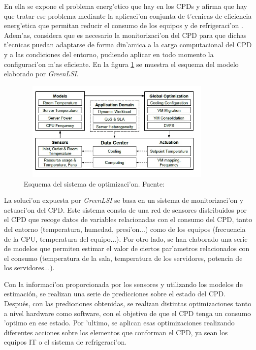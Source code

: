 	En ella se expone el problema energ'etico que hay en los CPDs y afirma que hay que tratar ese problema mediante la aplicaci'on conjunta de t'ecnicas de eficiencia energ'etica que permitan reducir el consumo de los equipos y de refrigeraci'on \cite{RespConj}. Adem'as, considera que es necesario la monitorizaci'on del CPD \cite{Monitorizacion} para que dichas t'ecnicas puedan adaptarse de forma din'amica a la carga computacional del CPD y a las condiciones del entorno, pudiendo aplicar en todo momento la configuraci'on m'as eficiente. En la figura \ref{fig1_2:esq} se muestra el esquema del modelo elaborado por \textit{GreenLSI}.

\begin{figure}[htbp]
  \centering
  \includegraphics[width=100mm, height=49mm]{imagenes/capitulo1/1_2Esquema}
   \caption{Esquema del sistema de optimizaci'on. Fuente:\cite{Esquema}}
   \label{fig1_2:esq}
\end{figure}
	
	La soluci'on expuesta por \textit{GreenLSI} se basa en un sistema de monitorizaci'on y actuaci'on del CPD. Este sistema consta de una red de sensores distribuidos por el CPD que recoge datos de variables relacionadas con el consumo del CPD, tanto del entorno (temperatura, humedad, presi'on...) como de los equipos (frecuencia de la CPU, temperatura del equipo...). Por otro lado, se han elaborado una serie de modelos \cite{Modelos} que permiten estimar el valor de ciertos par'ametros relacionados con el consumo (temperatura de la sala, temperatura de los servidores, potencia de los servidores...).

	Con la informaci'on proporcionada por los sensores y utilizando los modelos de estimación, se realizan una serie de predicciones sobre el estado del CPD. Después, con las predicciones obtenidas, se realizan distintas optimizaciones tanto a nivel hardware como software, con el objetivo de que el CPD tenga un consumo 'optimo en ese estado. Por 'ultimo, se aplican esas optimizaciones realizando diferentes acciones sobre los elementos que conforman el CPD, ya sean los equipos IT o el sistema de refrigeraci'on. 

